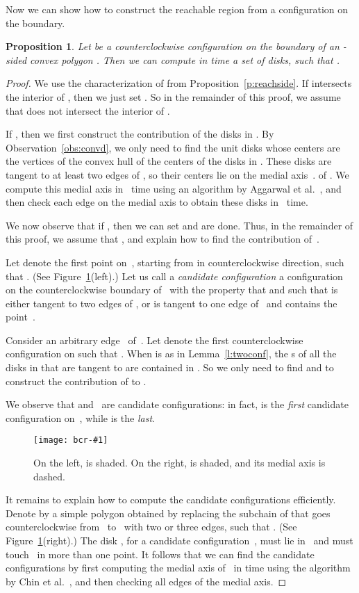 \documentclass[a4paper]{article}
\newtheorem{prop}[theorem]{Proposition}
\newcommand{\epsfigure}[2]{
  \begin{figure}[htb]
    \centerline{\texttt{[image: bcr-\#1]}}
    \caption{#2}
    \label{f:#1}
  \end{figure}}
\begin{document}
Now we can show how to construct the reachable region from a
configuration on the boundary.
\begin{prop}
  \label{p:computeside}
  Let  be a counterclockwise configuration on the boundary of
  an -sided convex polygon .  Then we can compute in  time
  a set  of  disks, such that
  .
\end{prop}
\begin{proof}
  We use the characterization of  from
  Proposition~\ref{p:reachside}.  If  intersects the
  interior of , then we just set
  .  So in the remainder of this
  proof, we assume that  does not intersect the interior
  of .

  If , then we first construct the
  contribution of the disks in . By
  Observation~\ref{obs:convd}, we only need to find the unit disks
  whose centers are the vertices of the convex hull of the centers of
  the disks in . These disks are tangent to at least two
  edges of , so their centers lie on the medial
  axis~\cite{agss-ltacv-89,csw-fmasp-99}.  of . We compute this
  medial axis in ~time using an algorithm by Aggarwal et
  al.~\cite{agss-ltacv-89}, and then check each edge on the medial
  axis to obtain these disks in ~time.

  We now observe that if , then we can set
   and are done.
  Thus, in the remainder of this proof, we assume that
  , and explain how to find the
  contribution of~.  

  Let  denote the first point on~, starting from  in
  counterclockwise direction, such that .  (See
  Figure~\ref{f:medial1}(left).)   Let us call a \emph{candidate
    configuration} a configuration~ on the counterclockwise
  boundary of~ with the property that  and such that  is either tangent
  to two edges of , or is tangent to one edge
  of~ and contains the point~.

  Consider an arbitrary edge~ of~.  Let  denote the
  first counterclockwise configuration on  
  such that . When  is as in
  Lemma~\ref{l:twoconf}, the s of all the disks in 
  that are tangent to  are contained in . So we only need to find  and  to
  construct the contribution of  to .

  We observe that  and~ are candidate
  configurations: in fact,  is the \emph{first} candidate
  configuration on~, while  is the \emph{last}.

\epsfigure{medial1}{On the left,  is shaded. On the right, 
  is shaded, and its medial axis is dashed.}


  It remains to explain how to compute the candidate configurations
  efficiently.  Denote by  a simple polygon obtained by replacing
  the subchain of  that goes counterclockwise from~ to~
  with two or three edges, such that . (See
  Figure~\ref{f:medial1}(right).)  The disk , for a
  candidate configuration~, must lie in~ and must
  touch~ in more than one point.  It follows that we can find
  the candidate configurations by first computing the medial axis
  of~ in  time using the algorithm by Chin et
  al.~\cite{csw-fmasp-99}, and then checking all edges of the medial
  axis.
\end{proof}
\end{document}
